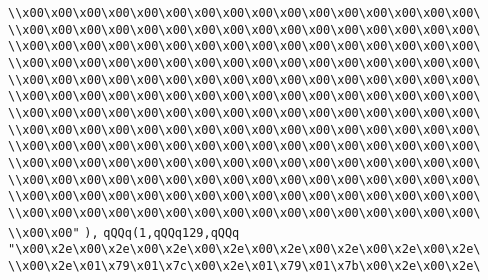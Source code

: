 \verb|\\x00\x00\x00\x00\x00\x00\x00\x00\x00\x00\x00\x00\x00\x00\x00\x00\|\newline
\verb|\\x00\x00\x00\x00\x00\x00\x00\x00\x00\x00\x00\x00\x00\x00\x00\x00\|\newline
\verb|\\x00\x00\x00\x00\x00\x00\x00\x00\x00\x00\x00\x00\x00\x00\x00\x00\|\newline
\verb|\\x00\x00\x00\x00\x00\x00\x00\x00\x00\x00\x00\x00\x00\x00\x00\x00\|\newline
\verb|\\x00\x00\x00\x00\x00\x00\x00\x00\x00\x00\x00\x00\x00\x00\x00\x00\|\newline
\verb|\\x00\x00\x00\x00\x00\x00\x00\x00\x00\x00\x00\x00\x00\x00\x00\x00\|\newline
\verb|\\x00\x00\x00\x00\x00\x00\x00\x00\x00\x00\x00\x00\x00\x00\x00\x00\|\newline
\verb|\\x00\x00\x00\x00\x00\x00\x00\x00\x00\x00\x00\x00\x00\x00\x00\x00\|\newline
\verb|\\x00\x00\x00\x00\x00\x00\x00\x00\x00\x00\x00\x00\x00\x00\x00\x00\|\newline
\verb|\\x00\x00\x00\x00\x00\x00\x00\x00\x00\x00\x00\x00\x00\x00\x00\x00\|\newline
\verb|\\x00\x00\x00\x00\x00\x00\x00\x00\x00\x00\x00\x00\x00\x00\x00\x00\|\newline
\verb|\\x00\x00\x00\x00\x00\x00\x00\x00\x00\x00\x00\x00\x00\x00\x00\x00\|\newline
\verb|\\x00\x00\x00\x00\x00\x00\x00\x00\x00\x00\x00\x00\x00\x00\x00\x00\|\newline
\verb|\\x00\x00"|\newline
\verb|),|\newline
\verb|qQQq(1,qQQq129,qQQq|\newline
\verb|"\x00\x2e\x00\x2e\x00\x2e\x00\x2e\x00\x2e\x00\x2e\x00\x2e\x00\x2e\|\newline
\verb|\\x00\x2e\x01\x79\x01\x7c\x00\x2e\x01\x79\x01\x7b\x00\x2e\x00\x2e\|\newline
